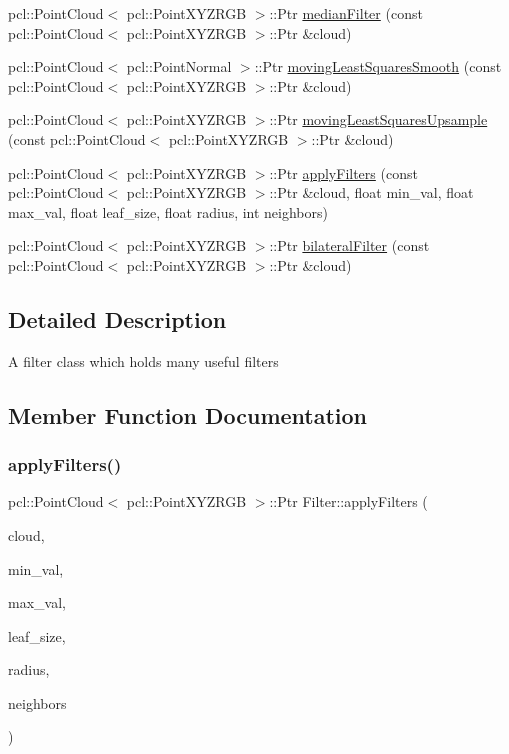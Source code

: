 \begin{DoxyCompactItemize}
\item 
pcl\+::\+Point\+Cloud$<$ pcl\+::\+Point\+X\+Y\+Z\+R\+GB $>$\+::Ptr \hyperlink{class_filter_aa01d2f8aa07ed9168112241f257ca6fc}{median\+Filter} (const pcl\+::\+Point\+Cloud$<$ pcl\+::\+Point\+X\+Y\+Z\+R\+GB $>$\+::Ptr \&cloud)
\item 
pcl\+::\+Point\+Cloud$<$ pcl\+::\+Point\+Normal $>$\+::Ptr \hyperlink{class_filter_aa6571b7e1da3fe0e0709f4c6ddca53e0}{moving\+Least\+Squares\+Smooth} (const pcl\+::\+Point\+Cloud$<$ pcl\+::\+Point\+X\+Y\+Z\+R\+GB $>$\+::Ptr \&cloud)
\item 
pcl\+::\+Point\+Cloud$<$ pcl\+::\+Point\+X\+Y\+Z\+R\+GB $>$\+::Ptr \hyperlink{class_filter_aa0575e5df91c3b38156c19601c955ec6}{moving\+Least\+Squares\+Upsample} (const pcl\+::\+Point\+Cloud$<$ pcl\+::\+Point\+X\+Y\+Z\+R\+GB $>$\+::Ptr \&cloud)
\item 
pcl\+::\+Point\+Cloud$<$ pcl\+::\+Point\+X\+Y\+Z\+R\+GB $>$\+::Ptr \hyperlink{class_filter_a29e76ae322042543a997e48f92cb36c9}{apply\+Filters} (const pcl\+::\+Point\+Cloud$<$ pcl\+::\+Point\+X\+Y\+Z\+R\+GB $>$\+::Ptr \&cloud, float min\+\_\+val, float max\+\_\+val, float leaf\+\_\+size, float radius, int neighbors)
\item 
pcl\+::\+Point\+Cloud$<$ pcl\+::\+Point\+X\+Y\+Z\+R\+GB $>$\+::Ptr \hyperlink{class_filter_ac2788ae9e8a4021c6a96fea5f8a8c48a}{bilateral\+Filter} (const pcl\+::\+Point\+Cloud$<$ pcl\+::\+Point\+X\+Y\+Z\+R\+GB $>$\+::Ptr \&cloud)
\end{DoxyCompactItemize}


\subsection{Detailed Description}
A filter class which holds many useful filters 

\subsection{Member Function Documentation}
\hypertarget{class_filter_a29e76ae322042543a997e48f92cb36c9}{}\label{class_filter_a29e76ae322042543a997e48f92cb36c9} 
\subsubsection{\texorpdfstring{apply\+Filters()}{applyFilters()}}
{\footnotesize\ttfamily pcl\+::\+Point\+Cloud$<$ pcl\+::\+Point\+X\+Y\+Z\+R\+GB $>$\+::Ptr Filter\+::apply\+Filters (\begin{DoxyParamCaption}\item[{const pcl\+::\+Point\+Cloud$<$ pcl\+::\+Point\+X\+Y\+Z\+R\+GB $>$\+::Ptr \&}]{cloud,  }\item[{float}]{min\+\_\+val,  }\item[{float}]{max\+\_\+val,  }\item[{float}]{leaf\+\_\+size,  }\item[{float}]{radius,  }\item[{int}]{neighbors }\end{DoxyParamCaption})}

